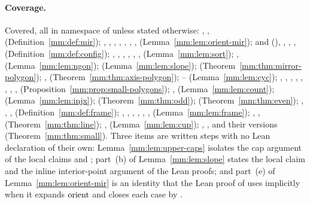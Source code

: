\paragraph{Coverage.}
{\raggedright
Covered, all in namespace  of  unless stated
otherwise:
, ,  (Definition~\ref{mm:def:mir});
, , , , ,
, ,  (Lemma~\ref{mm:lem:orient-mir});
 and 
(), , , , 
(Definition~\ref{mm:def:config});
, , , , ,
,  (Lemma~\ref{mm:lem:sort});
,  (Lemma~\ref{mm:lem:ngon});
 (Lemma~\ref{mm:lem:slope});
 (Theorem~\ref{mm:thm:mirror-polygon});
,  (Theorem~\ref{mm:thm:axis-polygon});
-- (Lemma~\ref{mm:lem:cyc});
, , ,
, , ,
, , 
(Proposition~\ref{mm:prop:small-polygons});
,  (Lemma~\ref{mm:lem:count}); 
(Lemma~\ref{mm:lem:injx});
 (Theorem~\ref{mm:thm:odd}); 
(Theorem~\ref{mm:thm:even});
, , ,  (Definition~\ref{mm:def:frame});
, , , ,
, ,  (Lemma~\ref{mm:lem:frame});
, ,  (Theorem~\ref{mm:thm:line});
,  (Lemma~\ref{mm:lem:cup});
, ,  and their  versions
(Theorem~\ref{mm:thm:small}).
Three items are written steps with no Lean declaration of their own: Lemma~\ref{mm:lem:upper-caps}
isolates the cap argument of the local claims  and ; part~(b) of
Lemma~\ref{mm:lem:slope} states the local claim  and the inline interior-point argument of
the Lean proofs; and part~(e) of Lemma~\ref{mm:lem:orient-mir} is an identity that the Lean proof of
 uses implicitly when it expands $\operatorname{orient}$ and closes each case by
.

}
